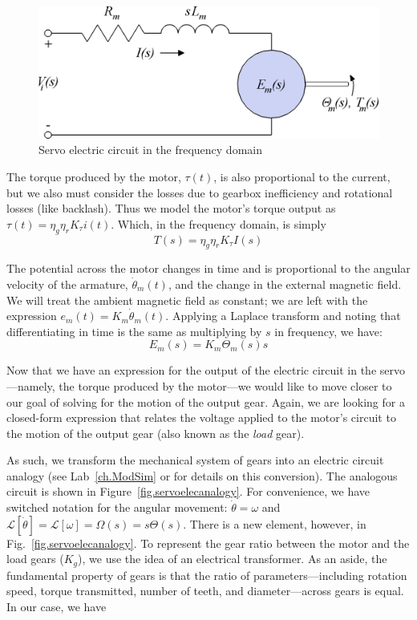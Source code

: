 \begin{figure}[bht]
\centering
\includegraphics[scale=\circscale]{servoelec}
\caption{\footnotesize
        Servo electric circuit in the frequency domain
        \label{fig.servoelec}
        }
\end{figure}
\par
The torque produced by the motor, $\tau(t)$, is also proportional to the current, but we also must consider the losses due to gearbox inefficiency and rotational losses (like backlash).  Thus we model the motor's torque output as $\tau(t) = \eta_g \eta_r K_\tau i(t)$.  Which, in the frequency domain, is simply
\begin{equation}
    T(s) = \eta_g \eta_r K_\tau I(s)
\end{equation}
\par
The potential across the motor changes in time and is proportional to the angular velocity of the armature, $\dot{\theta}_m(t)$, and the change in the external magnetic field.  We will treat the ambient magnetic field as constant; we are left with the expression $e_m(t) = K_m \dot{\theta}_m(t)$.  Applying a Laplace transform and noting that differentiating in time is the same as multiplying by $s$ in frequency, we have:
\begin{equation}
    E_m(s) = K_m \Theta_m(s) s
\end{equation}
\par
Now that we have an expression for the output of the electric circuit in the servo---namely, the torque produced by the motor---we would like to move closer to our goal of solving for the motion of the output gear.  Again, we are looking for a closed-form expression that relates the voltage applied to the motor's circuit to the motion of the output gear (also known as the \textit{load} gear).
\par
As such, we transform the mechanical system of gears into an electric circuit analogy (see Lab~\ref{ch.ModSim} or \cite{analogs} for details on this conversion).  The analogous circuit is shown in Figure~\ref{fig.servoelecanalogy}.  For convenience, we have switched notation for the angular movement: $\dot{\theta} = \omega$ and $\mathcal{L}[\dot{\theta}] = \mathcal{L}[\omega] = \Omega(s) = s\Theta(s)$. There is a new element, however, in Fig.\ \ref{fig.servoelecanalogy}.  To represent the gear ratio between the motor and the load gears ($K_g$), we use the idea of an electrical transformer.  As an aside, the fundamental property of gears is that the ratio of parameters---including rotation speed, torque transmitted, number of teeth, and diameter---across gears is equal.  In our case, we have
